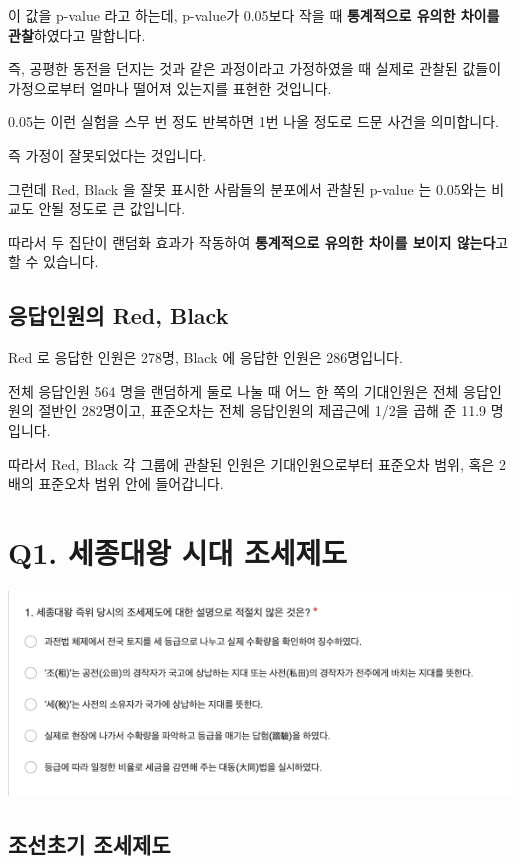 \documentclass[
]{book}
\begin{document}
이 값을 p-value 라고 하는데, p-value가 0.05보다 작을 때 \textbf{통계적으로 유의한 차이를 관찰}하였다고 말합니다.

즉, 공평한 동전을 던지는 것과 같은 과정이라고 가정하였을 때 실제로 관찰된 값들이 가정으로부터 얼마나 떨어져 있는지를 표현한 것입니다.

0.05는 이런 실험을 스무 번 정도 반복하면 1번 나올 정도로 드문 사건을 의미합니다.

즉 가정이 잘못되었다는 것입니다.

그런데 Red, Black 을 잘못 표시한 사람들의 분포에서 관찰된 p-value 는 0.05와는 비교도 안될 정도로 큰 값입니다.

따라서 두 집단이 랜덤화 효과가 작동하여 \textbf{통계적으로 유의한 차이를 보이지 않는다}고 할 수 있습니다.

\subsection{응답인원의 Red, Black}\label{uxc751uxb2f5uxc778uxc6d0uxc758-red-black-3}

Red 로 응답한 인원은 278명, Black 에 응답한 인원은 286명입니다.

전체 응답인원 564 명을 랜덤하게 둘로 나눌 때 어느 한 쪽의 기대인원은 전체 응답인원의 절반인 282명이고, 표준오차는 전체 응답인원의 제곱근에 1/2을 곱해 준 11.9 명입니다.

따라서 Red, Black 각 그룹에 관찰된 인원은 기대인원으로부터 표준오차 범위, 혹은 2배의 표준오차 범위 안에 들어갑니다.

\section{Q1. 세종대왕 시대 조세제도}\label{q1.-uxc138uxc885uxb300uxc655-uxc2dcuxb300-uxc870uxc138uxc81cuxb3c4}

\includegraphics[width=0.75\linewidth]{./pics/Quiz230322_Q1}

\subsection{조선초기 조세제도}\label{uxc870uxc120uxcd08uxae30-uxc870uxc138uxc81cuxb3c4}
\end{document}
